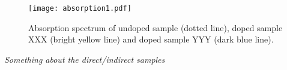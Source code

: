 \begin{figure}[h]
\begin{center}
\texttt{[image: absorption1.pdf]}
\caption{Absorption spectrum of undoped sample (dotted line), doped sample XXX (bright yellow line) and doped sample YYY (dark blue line). 
\label{fig:abs1}}
\end{center}
\end{figure}

\emph{Something about the direct/indirect samples}



































